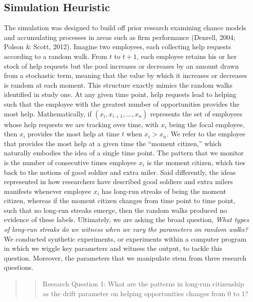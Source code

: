 \documentclass[english,,man]{apa6}
\theoremstyle{definition}
\theoremstyle{definition}
\theoremstyle{definition}
\theoremstyle{remark}
\begin{document}
\hypertarget{simulation-heuristic}{%
\subsection{Simulation Heuristic}\label{simulation-heuristic}}

The simulation was designed to build off prior research examining chance
models and accumulating processes in areas such as firm performance
(Denrell, 2004; Polson \& Scott, 2012). Imagine two employees, each
collecting help requests according to a random walk. From \(t\) to
\(t + 1\), each employee retains his or her stock of help requests but
the pool increases or decreases by an amount drawn from a stochastic
term, meaning that the value by which it increases or decreases is
random at each moment. This structure exactly mimics the random walks
identified in study one. At any given time point, help requests lead to
helping such that the employee with the greatest number of opportunities
provides the most help. Mathematically, if
\((x_i, x_{i+1}, \ldots, x_n)\) represents the set of employees whose
help requests we are tracking over time, with \(x_i\) being the focal
employee, then \(x_i\) provides the most help at time \(t\) when
\(x_i > x_n\). We refer to the employee that provides the most help at a
given time the \enquote{moment citizen,} which naturally embodies the
idea of a single time point. The pattern that we monitor is the number
of consecutive times employee \(x_i\) is the moment citizen, which ties
back to the notions of good soldier and extra miler. Said differently,
the ideas represented in how researchers have described good soldiers
and extra milers manifests whenever employee \(x_i\) has long-run
streaks of being the moment citizen, whereas if the moment citizen
changes from time point to time point, such that no long-run streaks
emerge, then the random walks produced no evidence of these labels.
Ultimately, we are asking the broad question, \emph{What types of
long-run streaks do we witness when we vary the parameters on random
walks?} We conducted synthetic experiments, or experiments within a
computer program in which we wiggle key parameters and witness the
output, to tackle this question. Moreover, the parameters that we
manipulate stem from three research questions.

\begin{quote}
\begin{quote}
Research Question 1: What are the patterns in long-run citizenship as
the drift parameter on helping opportunities changes from 0 to 1?
\end{quote}
\end{quote}
\end{document}
